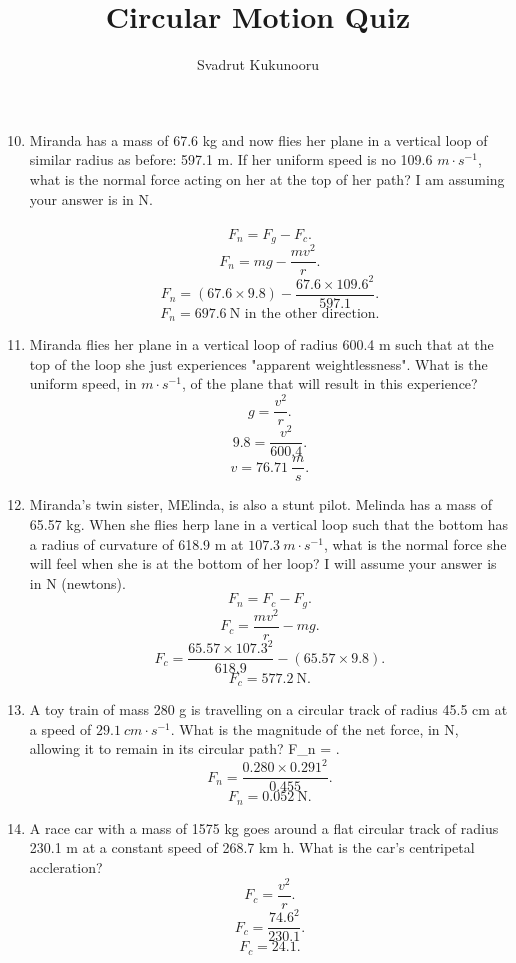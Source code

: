 \documentclass[a4paper]{report}
\title{Circular Motion Quiz}
\author{Svadrut Kukunooru}
\begin{document}
    \maketitle
    \begin{enumerate}
    \setcounter{enumi}{9}
\item Miranda has a mass of 67.6 kg and now flies her plane in a vertical loop of similar radius as before: 597.1 m. If her uniform speed is no 109.6 $m\cdot s^{-1}$, what is the normal force acting on her at the top of her path? I am assuming your answer is in N. \\ \\ 
    \[
    F_n = F_g - F_c
    .\] 
    \[
    F_n = mg - \frac{mv^2}{r}
    .\] 
    \[
        F_n = (67.6 \times 9.8) - \frac{67.6\times 109.6^2}{597.1}
    .\] 
\[
        F_n = \boxed{697.6\ \text{N in the other direction.}}
\]
\item Miranda flies her plane in a vertical loop of radius 600.4 m such that at the top of the loop she just experiences "apparent weightlessness". What is the uniform speed, in $m \cdot s^{-1}$, of the plane that will result in this experience?
    \[
    g = \frac{v^2}{r}
    .\] 
    \[
    9.8 = \frac{v^2}{600.4}
    .\] 
    \[
        v = \boxed{76.71\ \frac{m}{s}.}
    \]
\item Miranda's twin sister, MElinda, is also a stunt pilot. Melinda has a mass of 65.57 kg. When she flies herp lane in a vertical loop such that the bottom has a radius of curvature of 618.9 m at $107.3\ m \cdot s^{-1}$, what is the normal force she will feel when she is at the bottom of her loop? I will assume your answer is in N (newtons). 
    \[
        F_n = F_c - F_g
    .\] 
    \[
    F_c = \frac{mv^2}{r} - mg
    .\] 
    \[
        F_c = \frac{65.57 \times 107.3^2}{618.9} - (65.57\times 9.8)
    .\] 
    \[
        F_c = \boxed{577.2\ \text{N}}
    .\] 

\item A toy train of mass 280 g is travelling on a circular track of radius 45.5 cm at a speed of $29.1\ cm \cdot s^{-1}$. What is the magnitude of the net force, in N, allowing it to remain in its circular path?
    F_n = 
    .\] 
    \[
        F_n = \frac{0.280\times 0.291^2}{0.455}
    .\] 
    \[
        F_n = \boxed{0.052\ \text{N}}
    .\] 

\item A race car with a mass of 1575 kg goes around a flat circular track of radius 230.1 m at a constant speed of 268.7 km h. What is the car's centripetal accleration? 
    \[
    F_c = \frac{v^2}{r}
    .\] 
    \[
    F_c = \frac{74.6^2}{230.1}
    .\] 
    \[
        F_c = \boxed{24.1}
    .\] 

\end{enumerate}
\end{document}
